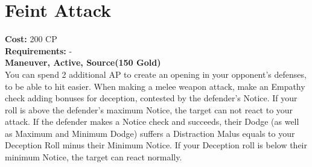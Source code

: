\section{Feint Attack}\label{maneuver:feintAttack}
\textbf{Cost:} 200 CP\\
\textbf{Requirements:} -\\
\textbf{Maneuver, Active, Source(150 Gold)}\\
You can spend 2 additional AP to create an opening in your opponent's defenses, to be able to hit easier.
When making a melee weapon attack, make an Empathy check adding bonuses for deception, contested by the defender's Notice.
If your roll is above the defender's maximum Notice, the target can not react to your attack.
If the defender makes a Notice check and succeeds, their Dodge (as well as Maximum and Minimum Dodge) suffers a Distraction Malus equals to your Deception Roll minus their Minimum Notice.
If your Deception roll is below their minimum Notice, the target can react normally.\\